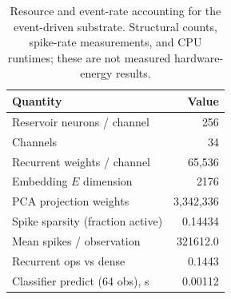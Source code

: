 \begin{table}[t]\centering\footnotesize
\caption{Resource and event-rate accounting for the event-driven substrate. Structural counts, spike-rate measurements, and CPU runtimes; these are not measured hardware-energy results.}
\label{tab:resource_event}
\begin{tabular}{l r}
\toprule
Quantity & Value \\
\midrule
Reservoir neurons / channel & 256 \\
Channels & 34 \\
Recurrent weights / channel & 65,536 \\
Embedding $E$ dimension & 2176 \\
PCA projection weights & 3,342,336 \\
Spike sparsity (fraction active) & 0.14434 \\
Mean spikes / observation & 321612.0 \\
Recurrent ops vs dense & 0.1443 \\
Classifier predict (64 obs), s & 0.00112 \\
\bottomrule
\end{tabular}
\end{table}

